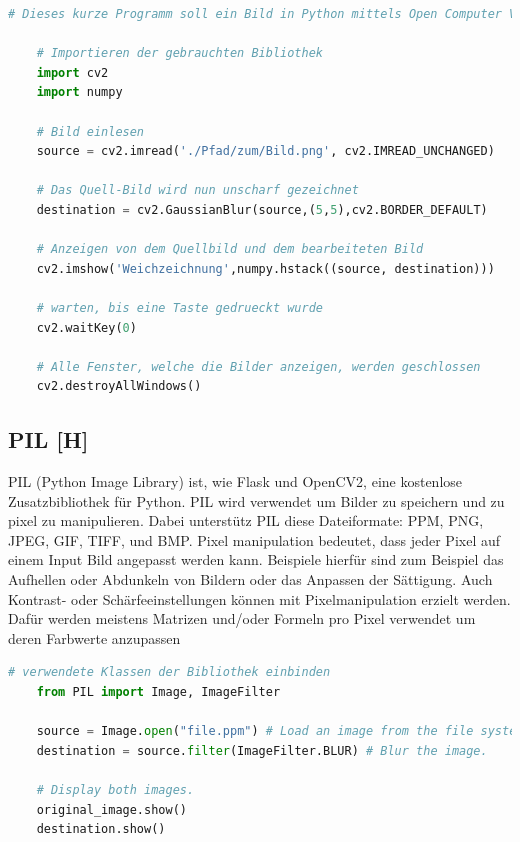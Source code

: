\begin{lstlisting}[language=Python,caption=OpenCV Demo,label=lst:tech:gaussianBlur]
    # Dieses kurze Programm soll ein Bild in Python mittels Open Computer Vision weichzeichnen
    
    # Importieren der gebrauchten Bibliothek
    import cv2
    import numpy
    
    # Bild einlesen
    source = cv2.imread('./Pfad/zum/Bild.png', cv2.IMREAD_UNCHANGED)
    
    # Das Quell-Bild wird nun unscharf gezeichnet
    destination = cv2.GaussianBlur(source,(5,5),cv2.BORDER_DEFAULT)

    # Anzeigen von dem Quellbild und dem bearbeiteten Bild 
    cv2.imshow('Weichzeichnung',numpy.hstack((source, destination)))

    # warten, bis eine Taste gedrueckt wurde
    cv2.waitKey(0) 

    # Alle Fenster, welche die Bilder anzeigen, werden geschlossen
    cv2.destroyAllWindows() 
\end{lstlisting}

\subsection{PIL [H]}
PIL (Python Image Library) ist, wie Flask und OpenCV2, eine kostenlose Zusatzbibliothek für Python.
PIL wird verwendet um Bilder zu speichern und zu pixel zu manipulieren. Dabei unterstütz PIL diese
Dateiformate: PPM, PNG, JPEG, GIF, TIFF, und BMP. Pixel manipulation bedeutet, dass jeder Pixel auf einem
Input Bild angepasst werden kann. Beispiele hierfür sind zum Beispiel das Aufhellen oder Abdunkeln von
Bildern oder das Anpassen der Sättigung. Auch Kontrast- oder Schärfeeinstellungen können mit
Pixelmanipulation erzielt werden. Dafür werden meistens Matrizen und/oder Formeln pro Pixel verwendet um
deren Farbwerte anzupassen
\\



\begin{lstlisting}[language=Python,caption=PIL Demo,label=lst:tech:PIL]
    # verwendete Klassen der Bibliothek einbinden
    from PIL import Image, ImageFilter  

    source = Image.open("file.ppm") # Load an image from the file system.
    destination = source.filter(ImageFilter.BLUR) # Blur the image.

    # Display both images.
    original_image.show() 
    destination.show()
\end{lstlisting}



